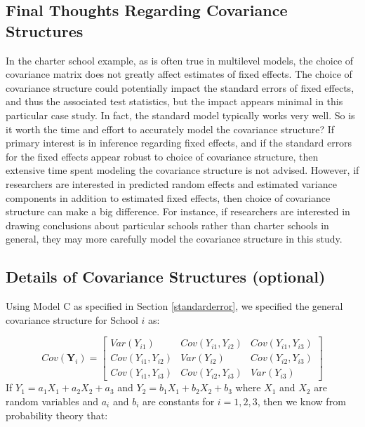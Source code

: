 \documentclass[
]{krantz}
\begin{document}
\subsection{Final Thoughts Regarding Covariance Structures}\label{final-thoughts-regarding-covariance-structures}

In the charter school example, as is often true in multilevel models, the choice of covariance matrix does not greatly affect estimates of fixed effects. The choice of covariance structure could potentially impact the standard errors of fixed effects, and thus the associated test statistics, but the impact appears minimal in this particular case study. In fact, the standard model typically works very well. So is it worth the time and effort to accurately model the covariance structure? If primary interest is in inference regarding fixed effects, and if the standard errors for the fixed effects appear robust to choice of covariance structure, then extensive time spent modeling the covariance structure is not advised. However, if researchers are interested in predicted random effects and estimated variance components in addition to estimated fixed effects, then choice of covariance structure can make a big difference. For instance, if researchers are interested in drawing conclusions about particular schools rather than charter schools in general, they may more carefully model the covariance structure in this study.

\subsection{Details of Covariance Structures (optional)}\label{optionalcov}

Using Model C as specified in Section \ref{standarderror}, we specified the general covariance structure for School \(i\) as:

\[ Cov(\mathbf{Y}_i) =  \left[
          \begin{array}{cccc}
            Var(Y_{i1}) & Cov(Y_{i1},Y_{i2}) & Cov(Y_{i1},Y_{i3}) \\
            Cov(Y_{i1},Y_{i2}) & Var(Y_{i2}) & Cov(Y_{i2},Y_{i3}) \\
            Cov(Y_{i1},Y_{i3}) & Cov(Y_{i2},Y_{i3}) & Var(Y_{i3})
          \end{array} \right] \]
If \(Y_1 = a_1 X_1 + a_2 X_2 + a_3\) and \(Y_2 = b_1 X_1 + b_2 X_2 + b_3\) where \(X_1\) and \(X_2\) are random variables and \(a_i\) and \(b_i\) are constants for \(i=1,2,3\), then we know from probability theory that:
\end{document}
